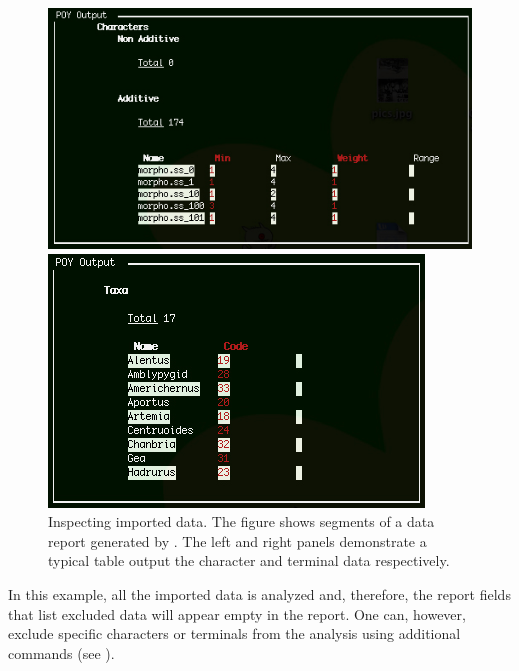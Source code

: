 \begin{figure}
\centering
\begin{minipage}[c]{0.52\textwidth}
   		\includegraphics[width=\textwidth]{figures/report2.jpg}
\end{minipage}
\quad
\begin{minipage}[c]{0.44\textwidth}
	   	\includegraphics[width=\textwidth]{figures/report3.jpg}
   	\end{minipage}
\caption{Inspecting imported data. The figure shows segments of a data report generated by . The left and right panels demonstrate a typical table output the character and terminal data respectively.}
\label{fig:reportdata}
\end{figure}

In this example, all the imported data is analyzed and, therefore, the report fields that list excluded data will appear empty in the report. One can, however, exclude specific characters or terminals from the analysis using additional commands (see ).

